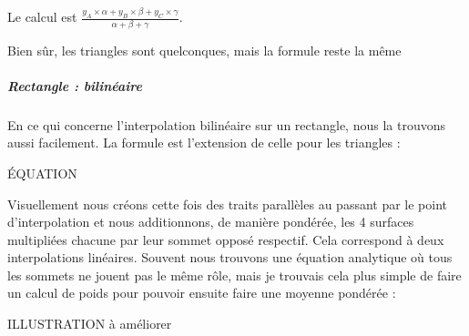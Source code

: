 Le calcul est \( \frac{y_A \times \alpha + y_B \times \beta + y_C \times \gamma}{\alpha + \beta + \gamma} \).

Bien sûr, les triangles sont quelconques, mais la formule reste la même

\subparagraph{Rectangle : bilinéaire}

En ce qui concerne l'interpolation bilinéaire sur un rectangle, nous la trouvons aussi facilement. La formule est l'extension de celle pour les triangles :

ÉQUATION

Visuellement nous créons cette fois des traits parallèles au passant par le point d'interpolation et nous additionnons, de manière pondérée, les 4 surfaces multipliées chacune par leur sommet opposé respectif. Cela correspond à deux interpolations linéaires. Souvent nous trouvons une équation analytique où tous les sommets ne jouent pas le même rôle, mais je trouvais cela plus simple de faire un calcul de poids pour pouvoir ensuite faire une moyenne pondérée :




ILLUSTRATION à améliorer

